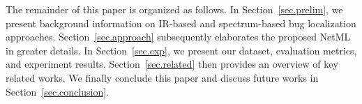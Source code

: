 The remainder of this paper is organized as follows. In Section~\ref{sec.prelim}, we present background information on IR-based and spectrum-based bug localization approaches. Section~\ref{sec.approach} subsequently elaborates the proposed NetML in greater details. In Section~\ref{sec.exp}, we present our dataset, evaluation metrics, and experiment results. Section~\ref{sec.related} then provides an overview of key related works. We finally conclude this paper and discuss future works in Section~\ref{sec.conclusion}.

